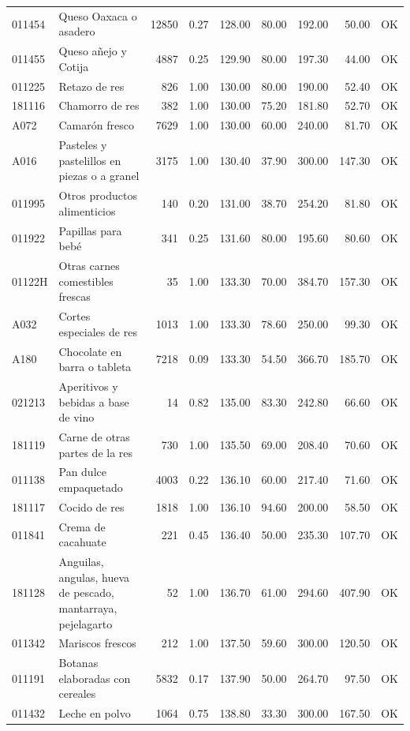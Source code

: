 \begin{table}[ht]
\begin{tabular}{llrrrrrrl}
  011454 & Queso Oaxaca o asadero & 12850 & 0.27 & 128.00 & 80.00 & 192.00 & 50.00 & OK \\ 
  011455 & Queso añejo y Cotija & 4887 & 0.25 & 129.90 & 80.00 & 197.30 & 44.00 & OK \\ 
  011225 & Retazo de res & 826 & 1.00 & 130.00 & 80.00 & 190.00 & 52.40 & OK \\ 
  181116 & Chamorro de res & 382 & 1.00 & 130.00 & 75.20 & 181.80 & 52.70 & OK \\ 
  A072 & Camarón fresco & 7629 & 1.00 & 130.00 & 60.00 & 240.00 & 81.70 & OK \\ 
  A016 & Pasteles y pastelillos en piezas o a granel & 3175 & 1.00 & 130.40 & 37.90 & 300.00 & 147.30 & OK \\ 
  011995 & Otros productos alimenticios & 140 & 0.20 & 131.00 & 38.70 & 254.20 & 81.80 & OK \\ 
  011922 & Papillas para bebé & 341 & 0.25 & 131.60 & 80.00 & 195.60 & 80.60 & OK \\ 
  01122H & Otras carnes comestibles frescas &  35 & 1.00 & 133.30 & 70.00 & 384.70 & 157.30 & OK \\ 
  A032 & Cortes especiales de res & 1013 & 1.00 & 133.30 & 78.60 & 250.00 & 99.30 & OK \\ 
  A180 & Chocolate en barra o tableta & 7218 & 0.09 & 133.30 & 54.50 & 366.70 & 185.70 & OK \\ 
  021213 & Aperitivos y bebidas a base de vino &  14 & 0.82 & 135.00 & 83.30 & 242.80 & 66.60 & OK \\ 
  181119 & Carne de otras partes de la res & 730 & 1.00 & 135.50 & 69.00 & 208.40 & 70.60 & OK \\ 
  011138 & Pan dulce empaquetado & 4003 & 0.22 & 136.10 & 60.00 & 217.40 & 71.60 & OK \\ 
  181117 & Cocido de res & 1818 & 1.00 & 136.10 & 94.60 & 200.00 & 58.50 & OK \\ 
  011841 & Crema de cacahuate & 221 & 0.45 & 136.40 & 50.00 & 235.30 & 107.70 & OK \\ 
  181128 & Anguilas, angulas, hueva de pescado, mantarraya, pejelagarto &  52 & 1.00 & 136.70 & 61.00 & 294.60 & 407.90 & OK \\ 
  011342 & Mariscos frescos & 212 & 1.00 & 137.50 & 59.60 & 300.00 & 120.50 & OK \\ 
  011191 & Botanas elaboradas con cereales & 5832 & 0.17 & 137.90 & 50.00 & 264.70 & 97.50 & OK \\ 
  011432 & Leche en polvo & 1064 & 0.75 & 138.80 & 33.30 & 300.00 & 167.50 & OK \\ 

\end{tabular}
\end{table}
